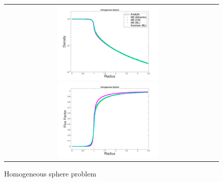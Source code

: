 \begin{figure}[h]
  \centering
  \begin{tabular}{cc}
    \includegraphics[width=0.5\textwidth]{figures/HomogeneousSphere_ClosureComparison_Density}
    \includegraphics[width=0.5\textwidth]{figures/HomogeneousSphere_ClosureComparison_FluxFactor}
  \end{tabular}
   \caption{Homogeneous sphere problem}
  \label{fig:HomogeneousSphere}
\end{figure}

\clearpage